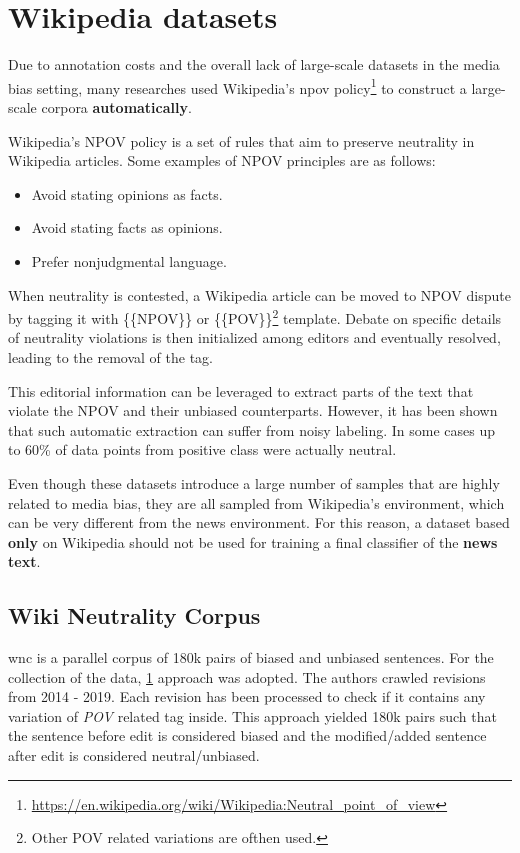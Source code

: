 \section{Wikipedia datasets}\label{wiki-npov}
Due to annotation costs and the overall lack of large-scale datasets in the media bias setting, many researches \cite{pryzant2020automatically,recasens2013linguistic,hube2019neural} used Wikipedia's \Gls{npov} policy\footnote{\url{https://en.wikipedia.org/wiki/Wikipedia:Neutral_point_of_view}} to construct a large-scale corpora \textbf{automatically}. 

Wikipedia's NPOV policy is a set of rules that aim to preserve neutrality in Wikipedia articles. Some examples of NPOV principles are as follows:
\begin{itemize}
    \item Avoid stating opinions as facts.
    \item Avoid stating facts as opinions.
    \item Prefer nonjudgmental language.
\end{itemize}

When neutrality is contested, a Wikipedia article can be moved to NPOV dispute by tagging it with \{\{NPOV\}\} or \{\{POV\}\}\footnote{Other POV related variations are ofthen used.} template. Debate on specific details of neutrality violations is then initialized among editors and eventually resolved, leading to the removal of the tag.

This editorial information can be leveraged to extract parts of the text that violate the NPOV and their unbiased counterparts. However, it has been shown \cite{hube2019neural,zhong-etal-2021-wikibias-detecting} that such automatic extraction can suffer from noisy labeling. In some cases \cite{hube2019neural} up to 60\% of data points from positive class were actually neutral.

Even though these datasets introduce a large number of samples that are highly related to media bias, they are all sampled from Wikipedia's environment, which can be very different from the news environment. For this reason, a dataset based \textbf{only} on Wikipedia should not be used for training a final classifier of the \textbf{news text}.




\subsection{Wiki Neutrality Corpus}\label{wiki}
\Gls{wnc} \cite{pryzant2020automatically} is a parallel corpus of 180k pairs of biased and unbiased sentences. For the collection of the data, \ref{wiki-npov} approach was adopted. The authors crawled revisions from 2014 - 2019. Each revision has been processed to check if it contains any variation of \textit{POV} related tag inside. This approach yielded 180k pairs such that the sentence before edit is considered biased and the modified/added sentence after edit is considered neutral/unbiased.
    
